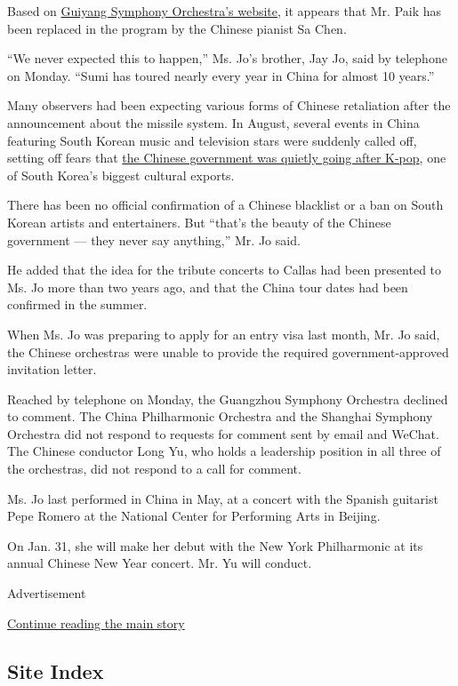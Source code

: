 Based on \href{http://www.gyso.cn/Pages/ProductDeta.aspx?Pid=26}{Guiyang
Symphony Orchestra's website}, it appears that Mr. Paik has been
replaced in the program by the Chinese pianist Sa Chen.

``We never expected this to happen,'' Ms. Jo's brother, Jay Jo, said by
telephone on Monday. ``Sumi has toured nearly every year in China for
almost 10 years.''

Many observers had been expecting various forms of Chinese retaliation
after the announcement about the missile system. In August, several
events in China featuring South Korean music and television stars were
suddenly called off, setting off fears that
\href{https://www.nytimes3xbfgragh.onion/2016/08/08/world/asia/china-korea-thaad.html}{the
Chinese government was quietly going after K-pop}, one of South Korea's
biggest cultural exports.

There has been no official confirmation of a Chinese blacklist or a ban
on South Korean artists and entertainers. But ``that's the beauty of the
Chinese government --- they never say anything,'' Mr. Jo said.

He added that the idea for the tribute concerts to Callas had been
presented to Ms. Jo more than two years ago, and that the China tour
dates had been confirmed in the summer.

When Ms. Jo was preparing to apply for an entry visa last month, Mr. Jo
said, the Chinese orchestras were unable to provide the required
government-approved invitation letter.

Reached by telephone on Monday, the Guangzhou Symphony Orchestra
declined to comment. The China Philharmonic Orchestra and the Shanghai
Symphony Orchestra did not respond to requests for comment sent by email
and WeChat. The Chinese conductor Long Yu, who holds a leadership
position in all three of the orchestras, did not respond to a call for
comment.

Ms. Jo last performed in China in May, at a concert with the Spanish
guitarist Pepe Romero at the National Center for Performing Arts in
Beijing.

On Jan. 31, she will make her debut with the New York Philharmonic at
its annual Chinese New Year concert. Mr. Yu will conduct.

Advertisement

\protect\hyperlink{after-bottom}{Continue reading the main story}

\hypertarget{site-index}{%
\subsection{Site Index}\label{site-index}}

